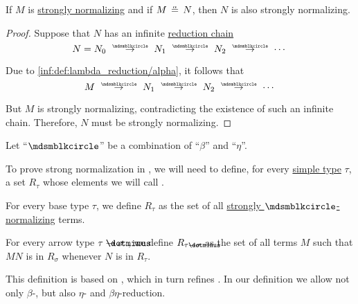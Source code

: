 \begin{proposition}\label{thm:strong_normalization_of_alpha_equivalent_term}
  If \( M \) is \hyperref[def:strongly_normalizing_lambda_term]{strongly normalizing} and if \( M \aequiv N \), then \( N \) is also strongly normalizing.
\end{proposition}
\begin{proof}
  Suppose that \( N \) has an infinite \hyperref[def:lambda_term_reduction_graph]{reduction chain}
  \begin{equation*}
    N = N_0 \pred N_1 \pred N_2 \pred \cdots
  \end{equation*}

  Due to \ref{inf:def:lambda_reduction/alpha}, it follows that
  \begin{equation*}
    M \pred N_1 \pred N_2 \pred \cdots
  \end{equation*}

  But \( M \) is strongly normalizing, contradicting the existence of such an infinite chain. Therefore, \( N \) must be strongly normalizing.
\end{proof}

\begin{definition}\label{def:strong_normalization_reducibility_candidate}
  Let \enquote{\( {\Anon} \)} be a combination of \enquote{\( \beta \)} and \enquote{\( \eta \)}.

  To prove strong normalization in , we will need to define, for every \hyperref[def:simple_type]{simple type} \( \tau \), a set \( R_\tau \) whose elements we will call .

  \begin{thmenum}
     For every base type \( \tau \), we define \( R_\tau \) as the set of all \hyperref[def:strongly_normalizing_lambda_term]{strongly \( \Anon \)-normalizing} terms.

     For every arrow type \( \tau \synimplies \sigma \) , we define \( R_{\tau \synimplies \sigma} \) as the set of all terms \( M \) such that \( MN \) is in \( R_\sigma \) whenever \( N \) is in \( R_\tau \).
  \end{thmenum}
\end{definition}
\begin{comments}
  \item This definition is based on , which in turn refines . In our definition we allow not only \( \beta \)-, but also \( \eta \)- and \( \beta\eta \)-reduction.
\end{comments}


